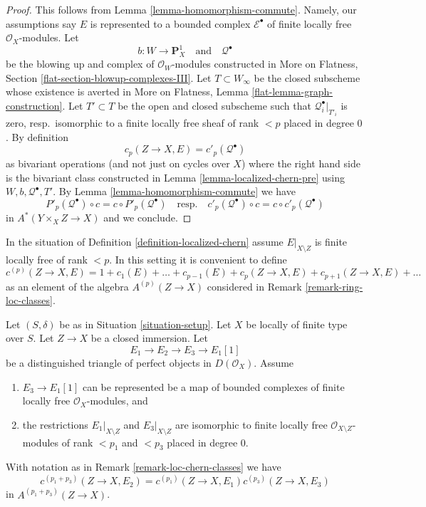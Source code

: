 \begin{proof}
This follows from Lemma \ref{lemma-homomorphism-commute}.
Namely, our assumptions say $E$
is represented to a bounded complex $\mathcal{E}^\bullet$
of finite locally free $\mathcal{O}_X$-modules. Let
$$
b : W \to \mathbf{P}^1_X
\quad\text{and}\quad
\mathcal{Q}^\bullet
$$
be the blowing up and complex of $\mathcal{O}_W$-modules constructed in
More on Flatness, Section \ref{flat-section-blowup-complexes-III}.
Let $T \subset W_\infty$ be the closed subscheme whose existence is
averted in More on Flatness, Lemma \ref{flat-lemma-graph-construction}.
Let $T' \subset T$ be the open and closed subscheme such that
$\mathcal{Q}_i^\bullet|_{T'_i}$ is zero, resp.\ isomorphic to a
finite locally free sheaf of rank $< p$ placed in degree $0$. By definition
$$
c_p(Z \to X, E) = c'_p(\mathcal{Q}^\bullet)
$$
as bivariant operations (and not just on cycles over $X$)
where the right hand side is the bivariant class constructed in
Lemma \ref{lemma-localized-chern-pre} using $W, b, \mathcal{Q}^\bullet, T'$.
By Lemma \ref{lemma-homomorphism-commute} we have
$$
P'_p(\mathcal{Q}^\bullet) \circ c = c \circ P'_p(\mathcal{Q}^\bullet)
\quad\text{resp.}\quad
c'_p(\mathcal{Q}^\bullet) \circ c = c \circ c'_p(\mathcal{Q}^\bullet)
$$
in $A^*(Y \times_X Z \to X)$ and we conclude.
\end{proof}

\begin{remark}
\label{remark-loc-chern-classes}
In the situation of Definition \ref{definition-localized-chern}
assume $E|_{X \setminus Z}$ is finite locally free of rank $< p$.
In this setting it is convenient to define
$$
c^{(p)}(Z \to X, E) = 1 + c_1(E) + \ldots + c_{p - 1}(E) +
c_p(Z \to X, E) + c_{p + 1}(Z \to X, E) + \ldots
$$
as an element of the algebra $A^{(p)}(Z \to X)$ considered in
Remark \ref{remark-ring-loc-classes}.
\end{remark}

\begin{lemma}
\label{lemma-additivity-loc-chern-c}
Let $(S, \delta)$ be as in Situation \ref{situation-setup}.
Let $X$ be locally of finite type over $S$. Let $Z \to X$ be
a closed immersion. Let
$$
E_1 \to E_2 \to E_3 \to E_1[1]
$$
be a distinguished triangle of perfect objects in $D(\mathcal{O}_X)$.
Assume
\begin{enumerate}
\item $E_3 \to E_1[1]$ can be represented be a map of bounded complexes
of finite locally free $\mathcal{O}_X$-modules, and
\item the restrictions $E_1|_{X \setminus Z}$ and $E_3|_{X \setminus Z}$
are isomorphic to finite locally free $\mathcal{O}_{X \setminus Z}$-modules
of rank $< p_1$ and $< p_3$ placed in degree $0$.
\end{enumerate}
With notation as in Remark \ref{remark-loc-chern-classes} we have
$$
c^{(p_1 + p_3)}(Z \to X, E_2) = c^{(p_1)}(Z \to X, E_1)c^{(p_3)}(Z \to X, E_3)
$$
in $A^{(p_1 + p_3)}(Z \to X)$.
\end{lemma}

